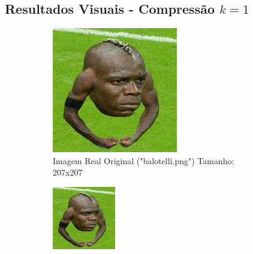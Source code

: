 \documentclass[12pt, a4paper]{article}
\begin{document}
\subsection{Resultados Visuais - Compressão $k=1$}
\begin{figure}[H]
    \centering
    \begin{subfigure}[b]{0.45\textwidth}
        \centering
        \includegraphics[width=\textwidth]{results/case_6/balotelli.png}
        \caption{Imagem Real Original ("balotelli.png") Tamanho: 207x207}
        \label{fig:selva_original}
    \end{subfigure}
    \hfill
    \begin{subfigure}[b]{0.45\textwidth}
        \centering
        \includegraphics[width=\textwidth]{results/case_6/compressed_k1.png}

\end{subfigure}
\end{figure}
\end{document}
